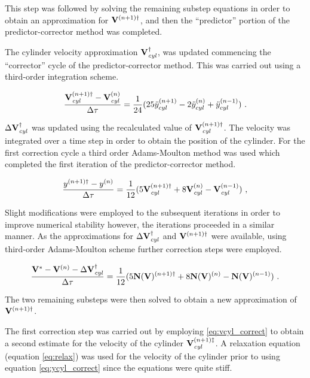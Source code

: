 This step was followed by solving the remaining substep equations in order to obtain an approximation for  $\mathbf{V}^{(n+1)\dag}$, and then the ``predictor'' portion of the predictor-corrector method was completed.

The cylinder velocity approximation $\mathbf{V}_{\mathit{cyl}}^{\dag}$, was updated commencing the ``corrector'' cycle of the predictor-corrector method. This was carried out using a third-order integration scheme. 

 \begin{equation} \centering
 \label{eq:vcyl_correct}
 \frac{\Vcyl^{(n+1)\dag} - \Vcyl^{(n)}}{\Delta\tau} = \frac{1}{24}(25\ddot{y}_{cyl}^{(n+1)} - 2\ddot{y}_{cyl}^{(n)} + \ddot{y}_{cyl}^{(n-1)}) ~.
 \end{equation}
 
 $\Delta\mathbf{V}_{\mathit{cyl}}^{\dag}$ was updated using the recalculated value of $\mathbf{V}_{\mathit{cyl}}^{(n+1)\dag}$. The velocity was integrated over a time step in order to obtain the position of the cylinder. For the first correction cycle a third order Adams-Moulton method was used which completed the first iteration of the predictor-corrector method. 
 
 \begin{equation} \centering
 \label{eq:ycyl_correct}
 \frac{y^{(n+1)\dag} - y^{(n)}}{\Delta\tau} = \frac{1}{12}(5\Vcyl^{(n+1)\dag} + 8\Vcyl^{(n)} - \Vcyl^{(n-1)}) ~,
 \end{equation}
 
 Slight modifications were employed to the subsequent iterations in order to improve numerical stability however, the iterations proceeded in a similar manner. As the approximations for  $\Delta\mathbf{V}_{\mathit{cyl}}^{\dag}$ and $\mathbf{V}^{(n+1)\dag}$  were available, using third-order Adams-Moulton scheme further correction steps were employed. 
 
 \begin{equation} \centering
 \label{eq:predict_general}
 \frac{\Vint - \Vn - \Delta\Vcyl^{\dag}}{\Delta\tau} = \frac{1}{12}(5\mathbf{N}(\vecV)^{(n+1)\dag} + 8\mathbf{N}(\vecV)^{(n)} - \mathbf{N}(\vecV)^{(n-1)}) ~.
 \end{equation}
 
 The two remaining substeps were then solved to obtain a new approximation of $\mathbf{V}^{(n+1)\dag}$. 
 
 The first correction step was carried out by employing \ref{eq:vcyl_correct} to obtain a second estimate for the velocity of the cylinder $\mathbf{V}_{\mathit{cyl}}^{(n+1)\ddag}$. A relaxation equation (equation \ref{eq:relax}) was used for the velocity of the cylinder prior to using equation \ref{eq:ycyl_correct} since the equations were quite stiff.
 
